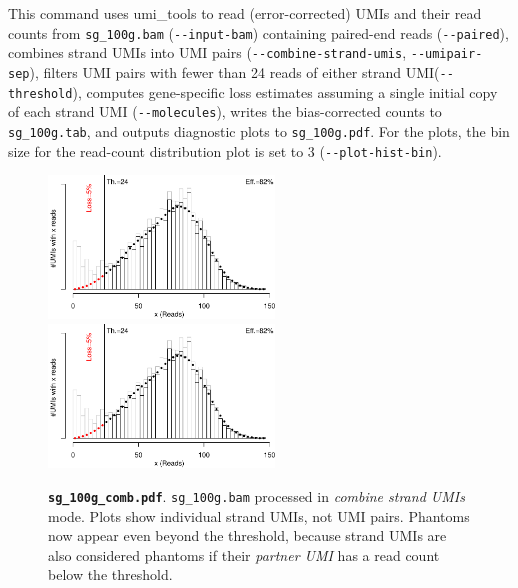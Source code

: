 \documentclass[10pt]{article}
\newcommand{\ddarg}[1]{\texttt{-{}-#1}}
\begin{document}
This command uses umi\_tools to read (error-corrected) UMIs and their read counts from \texttt{sg\_100g.bam} (\ddarg{input-bam}) containing paired-end reads (\ddarg{paired}), combines strand UMIs into UMI pairs (\ddarg{combine-strand-umis}, \ddarg{umipair-sep}), filters UMI pairs with fewer than 24 reads of either strand UMI(\ddarg{threshold}), computes gene-specific loss estimates assuming a single initial copy of each strand UMI (\ddarg{molecules}), writes the bias-corrected counts to \texttt{sg\_100g.tab}, and outputs diagnostic plots to \texttt{sg\_100g.pdf}. For the plots, the bin size for the read-count distribution plot is set to 3 (\ddarg{plot-hist-bin}).

\begin{figure}[H]
{\centering
\includegraphics[width=6cm,page=1]{../examples/sg_100g_comb.pdf}
\includegraphics[width=6cm,page=2]{../examples/sg_100g_comb.pdf}
\\}
\caption*{\textbf{\texttt{sg\_100g\_comb.pdf}}. \texttt{sg\_100g.bam} processed in \emph{combine strand UMIs} mode. Plots show individual strand UMIs, not UMI pairs. Phantoms now appear even beyond the threshold, because strand UMIs are also considered phantoms if their \emph{partner UMI} has a read count below the threshold.}
\end{figure}
\end{document}
